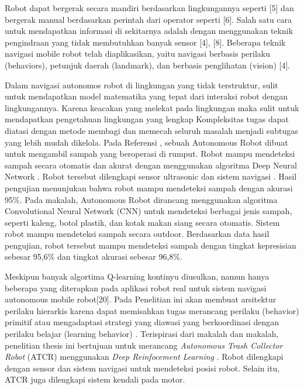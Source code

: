  Robot dapat bergerak secara mandiri berdasarkan lingkungannya seperti [5] dan bergerak manual berdasarkan perintah dari operator seperti [6]. 
 Salah satu cara untuk mendapatkan informasi di sekitarnya adalah dengan menggunakan teknik pengindraan yang tidak membutuhkan banyak sensor [4], [8].
 Beberapa teknik navigasi mobile robot telah diaplikasikan, yaitu navigasi berbasis perilaku (behaviors), petunjuk daerah (landmark), dan berbasis penglihatan (vision) [4]. 
 
 
 Dalam navigasi autonomos robot di lingkungan yang tidak terstruktur, sulit untuk mendapatkan model matematika yang tepat dari interaksi robot dengan lingkungannya. Karena keacakan yang melekat pada lingkungan  maka sulit untuk mendapatkan pengetahuan lingkungan yang lengkap \cite{Mustafa2019} Kompleksitas tugas dapat diatasi dengan metode membagi dan memecah seluruh masalah menjadi subtugas yang lebih mudah dikelola. Pada Referensi \cite{Bai2018}, sebuah Autonomous Robot dibuat untuk mengambil sampah yang beroperasi di rumput. Robot mampu mendeteksi sampah secara otomatis dan akurat dengan menggunakan algoritma Deep Neural Network \cite{Kong2009}. Robot tersebut dilengkapi sensor ultrasonic\cite{Michael2008} dan sistem navigasi \cite{Wang2008}. Hasil pengujian menunjukan bahwa robot mampu mendeteksi sampah dengan akurasi 95\%. Pada makalah\cite{Arai2019}, Autonomous Robot dirancang menggunakan algoritma Convolutional Neural Network (CNN) untuk mendeteksi berbagai jenis sampah, seperti kaleng, botol plastik, dan kotak makan siang secara otomatis. Sistem robot mampu mendeteksi sampah secara outdoor. Berdasarkan data hasil pengujian\cite{Arai2019}, robot tersebut mampu mendeteksi sampah dengan tingkat kepresisian sebesar 95,6\% dan tingkat akurasi sebesar 96,8\%.
 
 Meskipun banyak algortima Q-learning kontinyu diusulkan, namun hanya beberapa yang diterapkan pada aplikasi robot real untuk sistem navigasi autonomous mobile robot[20]. Pada Penelitian ini akan membuat arsitektur perilaku hierarkis karena dapat memisahkan tugas merancang perilaku (behavior) primitif atau mengadaptasi strategi yang diawasi yang berkoordinasi dengan perilaku belajar (learning behavior)  \cite{Hoffmann2003}. Terispirasi dari makalah \cite{Bai2018} dan makalah\cite{Kong2009,Michael2008,Wang2008,Arai2019}, 
 penelitian thesis ini bertujuan untuk merancang \textit{Autonomous Trash Collector Robot} (ATCR) menggunakan \textit{Deep Reinfocement Learning}  \cite{Mustafa2019}. Robot dilengkapi dengan sensor  dan sistem navigasi untuk mendeteksi posisi robot. Selain itu, ATCR juga dilengkapi sistem kendali pada motor\cite{Saputra2019}.


